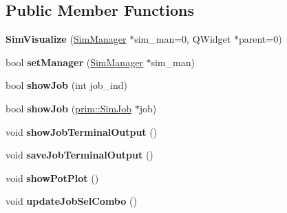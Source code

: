 \subsection*{Public Member Functions}
\begin{DoxyCompactItemize}
\item 
{\bfseries Sim\+Visualize} (\hyperlink{classgui_1_1SimManager}{Sim\+Manager} $\ast$sim\+\_\+man=0, Q\+Widget $\ast$parent=0)\hypertarget{classgui_1_1SimVisualize_ad98193242805086808c40597736cb7df}{}\label{classgui_1_1SimVisualize_ad98193242805086808c40597736cb7df}

\item 
bool {\bfseries set\+Manager} (\hyperlink{classgui_1_1SimManager}{Sim\+Manager} $\ast$sim\+\_\+man)\hypertarget{classgui_1_1SimVisualize_a3d95356e4d6116f14a43ef2d73d4817c}{}\label{classgui_1_1SimVisualize_a3d95356e4d6116f14a43ef2d73d4817c}

\item 
bool {\bfseries show\+Job} (int job\+\_\+ind)\hypertarget{classgui_1_1SimVisualize_af906322aa36b8df7d7243cbe12188574}{}\label{classgui_1_1SimVisualize_af906322aa36b8df7d7243cbe12188574}

\item 
bool {\bfseries show\+Job} (\hyperlink{classprim_1_1SimJob}{prim\+::\+Sim\+Job} $\ast$job)\hypertarget{classgui_1_1SimVisualize_a75308c992dcffe08cbc5396db2204af2}{}\label{classgui_1_1SimVisualize_a75308c992dcffe08cbc5396db2204af2}

\item 
void {\bfseries show\+Job\+Terminal\+Output} ()\hypertarget{classgui_1_1SimVisualize_aea810d268ff7cb9dec377ea723e7cac8}{}\label{classgui_1_1SimVisualize_aea810d268ff7cb9dec377ea723e7cac8}

\item 
void {\bfseries save\+Job\+Terminal\+Output} ()\hypertarget{classgui_1_1SimVisualize_a9890fda39389fd208cccd80fa43e2e37}{}\label{classgui_1_1SimVisualize_a9890fda39389fd208cccd80fa43e2e37}

\item 
void {\bfseries show\+Pot\+Plot} ()\hypertarget{classgui_1_1SimVisualize_ae68b1009e98429b7f8e685ea8cc88a6b}{}\label{classgui_1_1SimVisualize_ae68b1009e98429b7f8e685ea8cc88a6b}

\item 
void {\bfseries update\+Job\+Sel\+Combo} ()\hypertarget{classgui_1_1SimVisualize_a38553e45df662a07dc704ef958d1259d}{}\label{classgui_1_1SimVisualize_a38553e45df662a07dc704ef958d1259d}


\end{DoxyCompactItemize}
